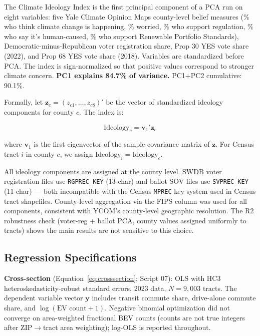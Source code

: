 \documentclass[12pt]{article}
\begin{document}
The Climate Ideology Index is the first principal component of a PCA run on eight
variables: five Yale Climate Opinion Maps county-level belief measures (\% who think
climate change is happening, \% worried, \% who support regulation, \% who say it's
human-caused, \% who support Renewable Portfolio Standards), Democratic-minus-Republican
voter registration share, Prop 30 YES vote share (2022), and Prop 68 YES vote share
(2018). Variables are standardized before PCA. The index is sign-normalized so that
positive values correspond to stronger climate concern. \textbf{PC1 explains 84.7\% of
variance.} PC1+PC2 cumulative: 90.1\%.

Formally, let $\mathbf{z}_{c} = (z_{c1}, \ldots, z_{c8})'$ be the vector of
standardized ideology components for county $c$. The index is:

\begin{equation}
  \text{Ideology}_c = \mathbf{v}_1'\mathbf{z}_c
  \label{eq:pca}
\end{equation}

where $\mathbf{v}_1$ is the first eigenvector of the sample covariance matrix of $\mathbf{z}$.
For Census tract $i$ in county $c$, we assign $\text{Ideology}_i = \text{Ideology}_c$.

All ideology components are assigned at the county level. SWDB voter registration files
use \texttt{RGPREC\_KEY} (13-char) and ballot SOV files use \texttt{SVPREC\_KEY} (11-char) --- both
incompatible with the Census \texttt{MPREC} key system used in Census tract shapefiles.
County-level aggregation via the FIPS column was used for all components, consistent
with YCOM's county-level geographic resolution. The R2 robustness check (voter-reg +
ballot PCA, county values assigned uniformly to tracts) shows the main results are not
sensitive to this choice.

\subsection{Regression Specifications}

\textbf{Cross-section} (Equation~\ref{eq:crosssection}; Script 07): OLS with HC3
heteroskedasticity-robust standard errors, 2023 data, $N = 9{,}003$ tracts.
The dependent variable vector $\mathbf{y}$ includes transit commute share,
drive-alone commute share, and $\log(\text{EV count}+1)$.
Negative binomial optimization did not converge on area-weighted fractional BEV
counts (counts are not true integers after ZIP$\to$tract area weighting);
log-OLS is reported throughout.
\end{document}
